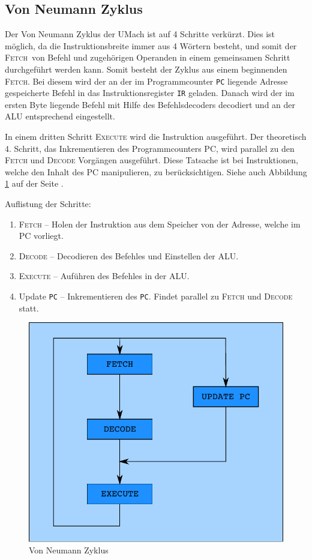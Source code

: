 \subsection[Neumann Zyklus]{Von Neumann Zyklus}
\label{subsec:Neumann-Zyklus}

Der Von Neumann Zyklus der UMach ist auf 4 Schritte verkürzt. Dies ist möglich,
da die Instruktionsbreite immer aus 4 Wörtern besteht, und somit der 
\glqq\textsc{Fetch}\grqq\ von 
Befehl und zugehörigen Operanden in einem gemeinsamen Schritt durchgeführt
werden kann. Somit besteht der Zyklus aus einem beginnenden \textsc{Fetch}. Bei
diesem wird der an der im Programmcounter \texttt{PC} liegende Adresse
gespeicherte Befehl in das Instruktionsregister \texttt{IR} geladen. Danach
wird der im ersten Byte liegende Befehl mit Hilfe des Befehlsdecoders decodiert
und an der ALU entsprechend eingestellt. 

In einem dritten Schritt \textsc{Execute} wird die Instruktion ausgeführt. Der
theoretisch 4. Schritt, das Inkrementieren des Programmcounters PC, wird
parallel zu den \textsc{Fetch} und \textsc{Decode} Vorgängen ausgeführt. Diese
Tatsache ist bei Instruktionen, welche den Inhalt des PC manipulieren, zu
berücksichtigen. Siehe auch Abbildung \ref{fig:Neumann-Zyklus} auf der Seite
\pageref{fig:Neumann-Zyklus}.

Auflistung der Schritte:

\begin{enumerate}
 \item \textsc{Fetch} --
       Holen der Instruktion aus dem Speicher von der Adresse, welche im PC
       vorliegt.
 \item \textsc{Decode} --
       Decodieren des Befehles und Einstellen der ALU.
 \item \textsc{Execute} --
       Auführen des Befehles in der ALU.
 \item Update \texttt{PC} --
       Inkrementieren des \texttt{PC}. Findet parallel zu \textsc{Fetch} und
       \textsc{Decode} statt.
\end{enumerate}

\begin{figure}[h!tp]
 \centering
 \includegraphics{./img/zyklus.pdf}
 \caption{Von Neumann Zyklus }
 \label{fig:Neumann-Zyklus}
\end{figure}

